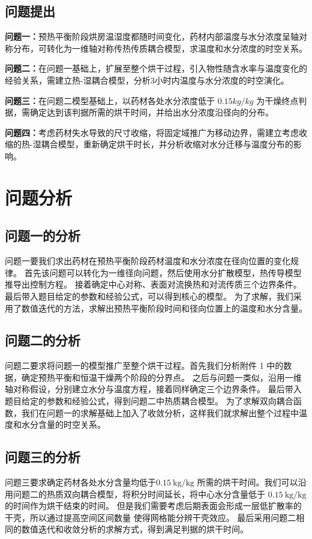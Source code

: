 \documentclass[12pt,a4paper]{article}
\begin{document}
\subsection{问题提出}

\textbf{问题一：}预热平衡阶段烘房温湿度都随时间变化，药材内部温度与水分浓度呈轴对称分布，可转化为一维轴对称传热传质耦合模型，求温度和水分浓度的时空关系。

\textbf{问题二：}在问题一基础上，扩展至整个烘干过程，引入物性随含水率与温度变化的经验关系，需建立热-湿耦合模型，分析3小时内温度与水分浓度的时空演化。

\textbf{问题三：}在问题二模型基础上，以药材各处水分浓度低于 $0.15 kg/kg$ 为干燥终点判据，需确定达到该判据所需的烘干时间，并给出水分浓度沿径向的分布。

\textbf{问题四：}考虑药材失水导致的尺寸收缩，将固定域推广为移动边界，需建立考虑收缩的热-湿耦合模型，重新确定烘干时长，并分析收缩对水分迁移与温度分布的影响。



\section{问题分析}

\subsection{问题一的分析}
问题一要我们求出药材在预热平衡阶段药材温度和水分浓度在径向位置的变化规律。
首先该问题可以转化为一维径向问题，然后使用水分扩散模型，热传导模型推导出控制方程。
接着确定中心对称、表面对流换热和对流传质三个边界条件。最后带入题目给定的参数和经验公式，可以得到核心的模型。
为了求解，我们采用了数值迭代的方法，求解出预热平衡阶段时间和径向位置上的温度和水分含量。
\subsection{问题二的分析}
问题二要求将问题一的模型推广至整个烘干过程。首先我们分析附件 1 中的数据，确定预热平衡和恒温干燥两个阶段的分界点。
之后与问题一类似，沿用一维轴对称假设，分别建立水分与温度方程，接着同样确定三个边界条件。
最后带入题目给定的参数和经验公式，得到问题二中热质耦合模型。
为了求解双向耦合函数，我们在问题一的求解基础上加入了收敛分析，这样我们就求解出整个过程中温度和水分含量的时空关系。
\subsection{问题三的分析}
问题三要求确定药材各处水分含量均低于\(0.15\ \mathrm{kg/kg}\) 所需的烘干时间。我们可以沿用问题二的热质双向耦合模型，将积分时间延长，将中心水分含量低于 \(0.15\ \mathrm{kg/kg}\) 的时间作为烘干结束的时间。
但是我们需要考虑后期表面会形成一层低扩散率的干壳，所以通过提高空间区间数量 使得网格能分辨干壳效应。
最后采用问题二相同的数值迭代和收敛分析的求解方式，得到满足判据的烘干时间。
\end{document}
